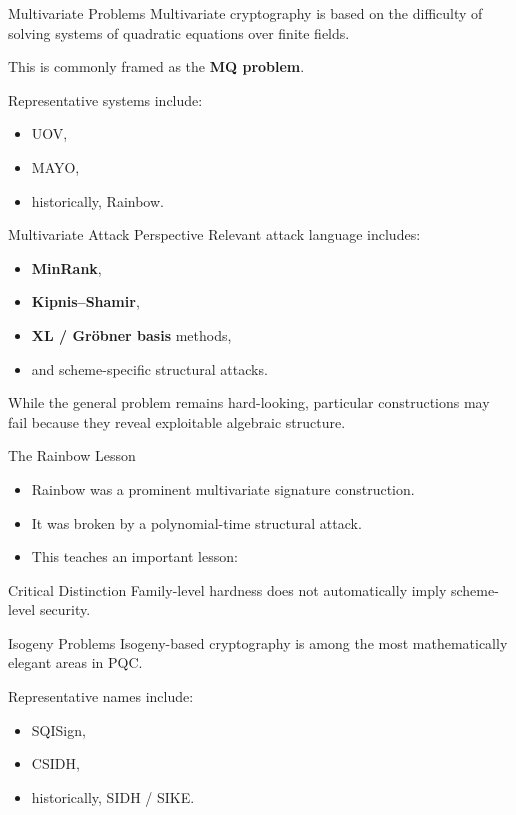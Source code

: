 \documentclass[aspectratio=169]{beamer}
\begin{document}
	\begin{frame}{Multivariate Problems}
		Multivariate cryptography is based on the difficulty of solving systems of quadratic equations over finite fields.
		
		\vspace{0.5em}
		This is commonly framed as the \textbf{MQ problem}.
		
		\vspace{0.5em}
		Representative systems include:
		\begin{itemize}
			\item UOV,
			\item MAYO,
			\item historically, Rainbow.
		\end{itemize}
	\end{frame}
	
	\begin{frame}{Multivariate Attack Perspective}
		Relevant attack language includes:
		\begin{itemize}
			\item \textbf{MinRank},
			\item \textbf{Kipnis--Shamir},
			\item \textbf{XL / Gr\"obner basis} methods,
			\item and scheme-specific structural attacks.
		\end{itemize}
		
		\vspace{0.5em}
		While the general problem remains hard-looking, particular constructions may fail because they reveal exploitable algebraic structure.
	\end{frame}
	
	\begin{frame}{The Rainbow Lesson}
		\begin{itemize}
			\item Rainbow was a prominent multivariate signature construction.
			\item It was broken by a polynomial-time structural attack.
			\item This teaches an important lesson:
		\end{itemize}
		
		\begin{block}{Critical Distinction}
			Family-level hardness does not automatically imply scheme-level security.
		\end{block}
	\end{frame}
	
	\begin{frame}{Isogeny Problems}
		Isogeny-based cryptography is among the most mathematically elegant areas in PQC.
		
		\vspace{0.5em}
		Representative names include:
		\begin{itemize}
			\item SQISign,
			\item CSIDH,
			\item historically, SIDH / SIKE.
		\end{itemize}
	\end{frame}
	
\end{document}
